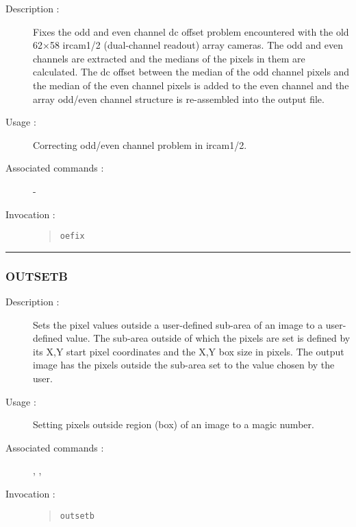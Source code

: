 \begin{description}

\item[Description :] Fixes the odd and even channel dc offset problem
encountered with the old 62$\times$58 {\sc ircam1/2} (dual-channel
readout) array cameras.  The odd and even channels are extracted and
the medians of the pixels in them are calculated.  The dc offset
between the median of the odd channel pixels and the median of the even
channel pixels is added to the even channel and the array odd/even
channel structure is re-assembled into the output file.

\item[Usage :] Correcting odd/even channel problem in {\sc ircam1/2}.
\item[Associated commands :] -
\item[Invocation :]

\begin{quote}{\tt  oefix }\end{quote}

\end{description}

\hrule 
\subsubsection*{\label{OUTSETB}OUTSETB}

\begin{description}

\item[Description :] Sets the pixel values outside a user-defined
sub-area of an image to a user-defined value.  The sub-area outside of
which the pixels are set is defined by its X,Y start pixel coordinates
and the X,Y box size in pixels.  The output image has the pixels
outside the sub-area set to the value chosen by the user.

\item[Usage :] Setting pixels outside region (box) of an image to a
magic number.

\item[Associated commands :] {\tt {}}, 
{\tt {}}, {\tt {}}

\item[Invocation :]

\begin{quote}{\tt  outsetb }\end{quote}

\end{description}

